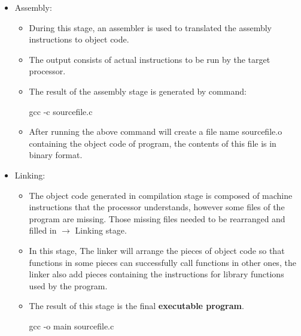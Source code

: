 \documentclass[a4paper]{article}
\begin{document}
\begin{enumerate}
\begin{itemize}
\begin{itemize}
            \item Assembly:
            \begin{itemize}
                \item During this stage, an assembler is used to translated the assembly instructions to object code.
                \item The output consists of actual instructions to be run by the target processor.
                \item The result of the assembly stage is generated by command:
                \begin{center}
                    gcc -c sourcefile.c
                \end{center}
                \item After running the above command will create a file name sourcefile.o containing the object code of program, the contents of this file is in binary format.
            \end{itemize}

            \item Linking:
            \begin{itemize}
                \item The object code generated in compilation stage is composed of machine instructions that the processor understands, however some files of the program are missing. Those missing files needed to be rearranged and filled in $\rightarrow$ Linking stage.
                \item In this stage, The linker will arrange the pieces of object code so that functions in some pieces can successfully call functions in other ones, the linker also add pieces containing the instructions for library functions used by the program.
                \item The result of this stage is the final \textbf{executable program}.
                \begin{center}
                    gcc -o main sourcefile.c
                \end{center}
            \end{itemize}
        \end{itemize}
    \end{itemize}


\end{enumerate}
\end{document}
